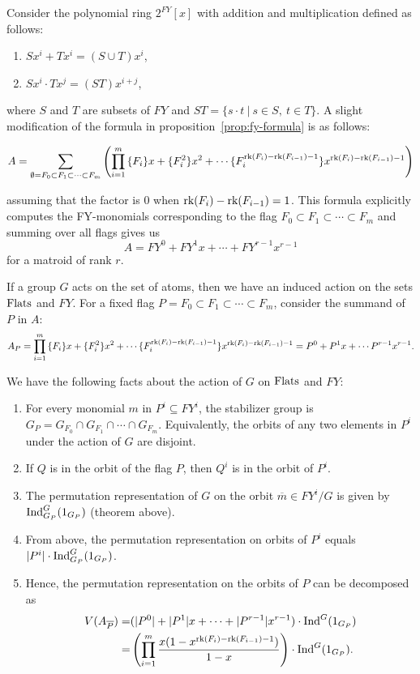\documentclass[11pt]{article}
\newcommand{\ind}{\text{\normalfont Ind}}
\newcommand{\rank}{\normalfont\text{rk}}
\newcommand{\flats}{\normalfont\text{Flats}}
\theoremstyle{remark}
\begin{document}
\hrulefill

Consider the polynomial ring $2^{FY}[x]$ with addition and multiplication defined as follows:
\begin{enumerate}
    \item $Sx^i + Tx^i = (S\cup T)x^i$,
    \item $Sx^i\cdot Tx^j = (ST)x^{i+j}$,
\end{enumerate}
where $S$ and $T$ are subsets of $FY$ and $ST=\{s\cdot t\ |\ s\in S,\ t\in T\}$.
A slight modification of the formula in proposition~\ref{prop:fy-formula} is as follows:

\begin{equation}
    \label{eqn:modH}
    A = \sum_{\emptyset = F_0\subset F_1\subset \cdots\subset F_m}{\left(\prod_{i=1}^m{
        \{F_i\}x + \{F_i^2\}x^2+ \cdots \{F_i^{\rank(F_i)-\rank(F_{i-1})-1}\}x^{\rank(F_i)-\rank(F_{i-1})-1}
    }\right)}
\end{equation}

assuming that the factor is 0 when $\rank(F_i)-\rank(F_{i-1}) = 1$. This formula explicitly computes
the FY-monomials corresponding to the flag $F_0\subset F_1\subset \cdots\subset F_m$ and summing over all flags gives us
$$A = FY^0 + FY^1x + \cdots + FY^{r-1}x^{r-1}$$
for a matroid of rank $r$.

\hrulefill

If a group $G$ acts on the set of atoms, then we have an induced action on the sets $\flats$ and $FY$.
For a fixed flag $P = F_0\subset F_1\subset \cdots\subset F_m$, consider the summand of $P$ in $A$:
    $$A_P = 
    \prod_{i=1}^m{
        \{F_i\}x + \{F_i^2\}x^2+ \cdots \{F_i^{\rank(F_i)-\rank(F_{i-1})-1}\}x^{\rank(F_i)-\rank(F_{i-1})-1}
    } = P^0 + P^1x+\cdots P^{r-1}x^{r-1}.$$

We have the following facts about the action of $G$ on $\flats$ and $FY$:
\begin{enumerate}
    \item For every monomial $m$ in $P^i\subseteq FY^i$, the stabilizer group is $G_P=
        G_{F_0}\cap G_{F_1}\cap \cdots\cap G_{F_m}$.
        Equivalently, the orbits of any two elements in $P^i$ under the action of $G$ are disjoint.
    \item If $Q$ is in the orbit of the flag $P$, then $Q^i$ is in the orbit of $P^i$.
    \item The permutation representation of $G$ on the orbit $\overline{m}\in FY^i/G$ is
        given by $\ind_{G_P}^G(1_{G_P})$ (theorem above).
    \item From above, the permutation representation on orbits of $P^i$ equals $|P^i|\cdot\ind_{G_P}^G(1_{G_P})$.
    \item Hence, the permutation representation on the orbits of $P$ can be decomposed as
        \begin{align*}
            V(A_{\overline{P}}) =& (|P^0|+|P^1|x+\cdots+|P^{r-1}|x^{r-1})\cdot\ind^G(1_{G_P})\\
            =&\left(\prod_{i=1}^m{
                \frac{x(1-x^{\rank(F_i)-\rank(F_{i-1})-1})}{1-x}}\right)\cdot\ind^G(1_{G_P}).
        \end{align*}
\end{enumerate}
\end{document}
